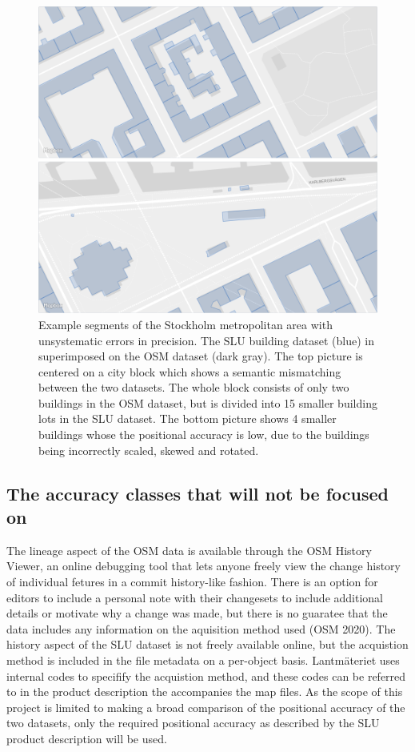 \documentclass[a4paper]{article}
\begin{document}
\begin{figure}[H]
    \centering
    \includegraphics[width=\textwidth,height=0.5\textheight,keepaspectratio]{img_map_compare}
    \caption{Example segments of the Stockholm metropolitan area with unsystematic errors in precision. The SLU building dataset (blue) in superimposed on the OSM dataset (dark gray). The top picture is centered on a city block which shows a semantic mismatching between the two datasets. The whole block consists of only two buildings in the OSM dataset, but is divided into 15 smaller building lots in the SLU dataset. The bottom picture shows 4 smaller buildings whose the positional accuracy is low, due to the buildings being incorrectly scaled, skewed and rotated.}
    \label{fig:space}
\end{figure}

\subsection{The accuracy classes that will not be focused on}

The lineage aspect of the OSM data is available through the OSM History Viewer, an online debugging tool that lets anyone freely view the change history of individual fetures in a commit history-like fashion. There is an option for editors to include a personal note with their changesets to include additional details or motivate why a change was made, but there is no guaratee that the data includes any information on the aquisition method used (OSM 2020). The history aspect of the SLU dataset is not freely available online, but the acquistion method is included in the file metadata on a per-object basis. Lantmäteriet uses internal codes to specifify the acquistion method, and these codes can be referred to in the product description the accompanies the map files. As the scope of this project is limited to making a broad comparison of the positional accuracy of the two datasets, only the required positional accuracy as described by the SLU product description will be used.
\end{document}
